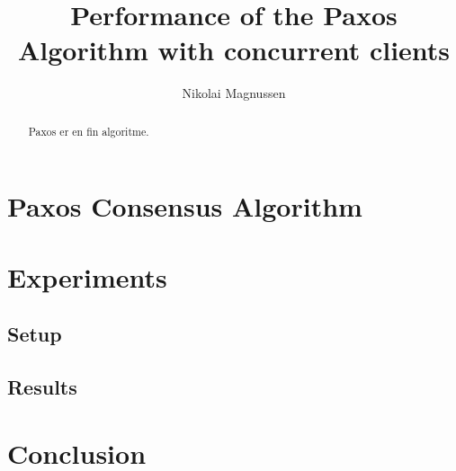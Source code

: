 \documentclass[conference]{IEEEtran}
\title{Performance of the Paxos Algorithm  with concurrent clients}
\author{Nikolai Magnussen}
\begin{document}
\maketitle

\begin{abstract}

	Paxos er en fin algoritme\cite{Lamport:1998:PP:279227.279229}\cite{VanRenesse:Internet}\cite{simple}.\cite{moderately}

\end{abstract}

\section{Paxos Consensus Algorithm}

\section{Experiments}

\subsection{Setup}

\subsection{Results}

\section{Conclusion}

\printbibliography
\end{document}
